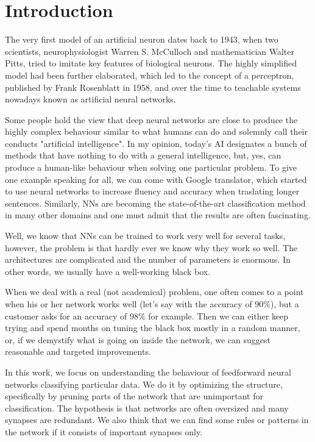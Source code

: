 \chapter{Introduction} \label{chap:introduction}
The very first model of an artificial neuron dates back to 1943, when two scientists, neurophysiologist Warren S. McCulloch and mathematician Walter Pitts, tried to imitate key features of biological neurons. The highly simplified model had been further elaborated, which led to the concept of a perceptron, published by Frank Rosenblatt in 1958, and over the time to teachable systems nowadays known as artificial neural networks.

Some people hold the view that deep neural networks are close to produce the highly complex behaviour similar to what humans can do and solemnly call their conducts "artificial intelligence". In my opinion, today's AI designates a bunch of methods that have nothing to do with a general intelligence, but, yes, can produce a human-like behaviour when solving one particular problem. To give one example speaking for all, we can come with Google translator, which started to use neural networks to increase fluency and accuracy when traslating longer sentences. Similarly, NNs are becoming the state-of-the-art classification method in many other domains and one must admit that the results are often fascinating.

Well, we know that NNs can be trained to work very well for several tasks, however, the problem is that hardly ever we know why they work so well. The architectures are complicated and the number of parameters is enormous. In other words, we usually have a well-working black box.

When we deal with a real (not academical) problem, one often comes to a point when his or her network works well (let's say with the accuracy of $ 90\% $), but a customer asks for an accuracy of $ 98\% $ for example. Then we can either keep trying and spend months on tuning the black box mostly in a random manner, or, if we demystify what is going on inside the network, we can suggest reasonable and targeted improvements.

In this work, we focus on understanding the behaviour of feedforward neural networks classifying particular data. We do it by optimizing the structure, specifically by pruning parts of the network that are unimportant for classification. The hypothesis is that networks are often oversized and many synapses are redundant. We also think that we can find some rules or patterns in the network if it consists of important synapses only.


